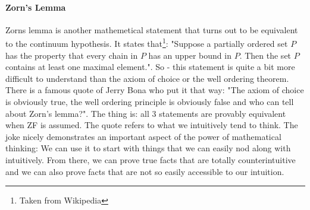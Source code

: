 


\paragraph{Zorn's Lemma}
Zorns lemma is another mathemetical statement that turns out to be equivalent to the continuum hypothesis. It states that\footnote{Taken from Wikipedia}: "Suppose a partially ordered set $P$ has the property that every chain in $P$ has an upper bound in $P$. Then the set $P$ contains at least one maximal element.". So - this statement is quite a bit more difficult to understand than the axiom of choice or the well ordering theorem. There is a famous quote of Jerry Bona who put it that way: "The axiom of choice is obviously true, the well ordering principle is obviously false and who can tell about Zorn's lemma?". The thing is: all 3 statements are provably equivalent when ZF is assumed. The quote refers to what we intuitively tend to think. The joke nicely demonstrates an important aspect of the power of mathematical thinking: We can use it to start with things that we can easily nod along with intuitively. From there, we can prove true facts that are totally counterintuitive and we can also prove facts that are not so easily accessible to our intuition.





